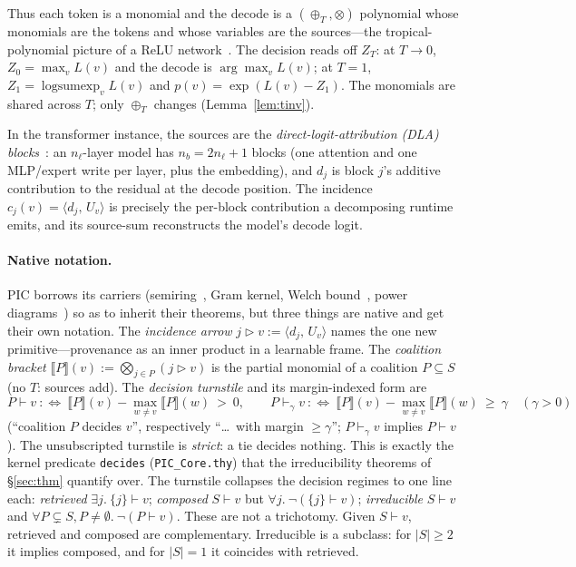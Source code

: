 \documentclass[11pt]{article}
\theoremstyle{definition}
\theoremstyle{plain}
\theoremstyle{remark}
\newcommand{\inner}[2]{\langle #1,\, #2\rangle}
\begin{document}
Thus each token is a monomial and the decode is a $(\oplus_T,\otimes)$ polynomial whose monomials are the
tokens and whose variables are the sources---the tropical-polynomial picture of a ReLU network~\cite{zhang2018tropical,maclagan2015tropical}. The
decision reads off $Z_T$: at $T\to0$, $Z_0=\max_v L(v)$ and the decode is $\arg\max_v L(v)$; at $T=1$,
$Z_1=\operatorname{logsumexp}_v L(v)$ and $p(v)=\exp(L(v)-Z_1)$. The monomials are shared across $T$; only
$\oplus_T$ changes (Lemma~\ref{lem:tinv}).

In the transformer instance, the sources are the \emph{direct-logit-attribution (DLA) blocks}~\cite{elhage2021mathematical}: an $n_\ell$-layer model has $n_b=2n_\ell+1$
blocks (one attention and one MLP/expert write per layer, plus the embedding), and $d_j$ is block $j$'s
additive contribution to the residual at the decode position. The incidence $c_j(v)=\inner{d_j}{U_v}$ is
precisely the per-block contribution a decomposing runtime emits, and its source-sum reconstructs the
model's decode logit.

\paragraph{Native notation.} PIC borrows its carriers (semiring~\cite{green2007provenance}, Gram kernel,
Welch bound~\cite{welch1974lower}, power diagrams~\cite{aurenhammer1987power}) so as to inherit their theorems, but three things are native and get their own notation. The
\emph{incidence arrow} $j\triangleright v:=\inner{d_j}{U_v}$ names the one new primitive---provenance as
an inner product in a learnable frame. The \emph{coalition bracket}
$\llbracket P\rrbracket(v):=\bigotimes_{j\in P}(j\triangleright v)$ is the partial monomial of a coalition
$P\subseteq S$ (no $T$: sources add). The \emph{decision turnstile} and its margin-indexed form are
\[
  P\vdash v\ :\Longleftrightarrow\ \llbracket P\rrbracket(v)-\max_{w\neq v}\llbracket P\rrbracket(w)\ >\ 0,
  \qquad
  P\vdash_\gamma v\ :\Longleftrightarrow\ \llbracket P\rrbracket(v)-\max_{w\neq v}\llbracket P\rrbracket(w)\ \ge\ \gamma
  \quad(\gamma>0)
\]
(``coalition $P$ decides $v$'', respectively ``\dots\ with margin $\ge\gamma$''; $P\vdash_\gamma v$
implies $P\vdash v$). The unsubscripted turnstile is \emph{strict}: a tie decides nothing. This is
exactly the kernel predicate \texttt{decides} (\texttt{PIC\_Core.thy}) that the irreducibility theorems of
\S\ref{sec:thm} quantify over. The turnstile collapses the decision regimes to one line each:
\emph{retrieved} $\exists j.\ \{j\}\vdash v$; \emph{composed} $S\vdash v$ but
$\forall j.\ \neg(\{j\}\vdash v)$; \emph{irreducible} $S\vdash v$ and
$\forall P\subsetneq S,P\neq\emptyset.\ \neg(P\vdash v)$. These are not a trichotomy. Given $S\vdash v$,
retrieved and composed are complementary. Irreducible is a subclass: for $|S|\ge2$ it implies composed,
and for $|S|=1$ it coincides with retrieved.
\end{document}
